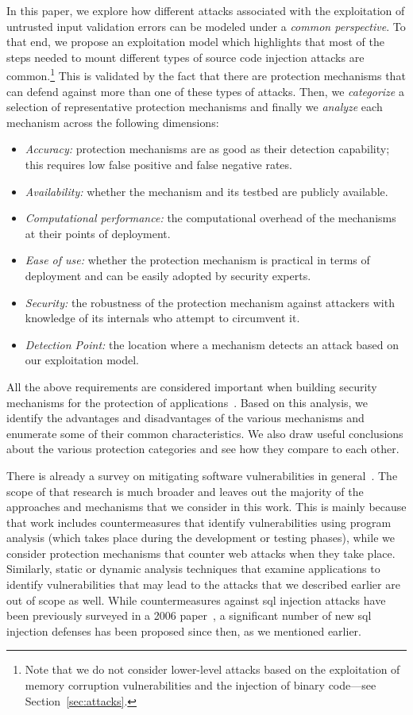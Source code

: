 \documentclass[conference]{IEEEtran}
\begin{document}
In this paper, we explore how different attacks associated with 
the exploitation of untrusted input validation errors can be modeled 
under a {\it common perspective}. To that end, we propose an exploitation
model which highlights that most of the steps needed to mount
different types of source code injection attacks are
common.\footnote{Note that we do not consider lower-level attacks based on
the exploitation of memory corruption vulnerabilities and the injection
of binary code---see Section~\ref{sec:attacks}.} This is validated by the fact that
there are protection mechanisms that can defend against more than one of these
types of attacks. Then, we {\it categorize} a selection of representative
protection mechanisms and finally we {\it analyze} each mechanism across the
following dimensions:
\begin{itemize}
\item {\it Accuracy:} protection mechanisms are as good
  as their detection capability; this requires low false positive and
  false negative rates.
\item {\it Availability:} whether the mechanism and its
  testbed are publicly available.
\item {\it Computational performance:} the computational
  overhead of the mechanisms at their points of deployment.
\item {\it Ease of use:} whether the protection
  mechanism is practical in terms of deployment
  and can be easily adopted by security experts.
\item {\it Security:} the robustness of the protection mechanism against
  attackers with knowledge of its internals who attempt to circumvent it.
\item {\it Detection Point:} the location where a mechanism detects an attack
  based on our exploitation model.
\end{itemize}

\noindent
All the above requirements are considered important
when building security mechanisms for the protection of
applications~\cite{A01,A00,SPWS13,nature2014}.
Based on this analysis, we identify the advantages
and disadvantages of the
various mechanisms and enumerate some of their common
characteristics. We also draw useful conclusions
about the various protection categories and see how they compare
to each other.

There is already a survey on mitigating software vulnerabilities
in general~\cite{SZ12}. The scope of that
research is much broader and leaves out the majority of the
approaches and mechanisms that we consider in this work.
This is mainly because that work includes countermeasures
that identify vulnerabilities using program analysis
(which takes place during the development or testing phases), while
we consider protection mechanisms that counter
web attacks when they take place. Similarly, static or
dynamic analysis techniques that examine applications to
identify vulnerabilities that may lead to the attacks
that we described earlier are out of scope as well.
While countermeasures against {\sc sql}
injection attacks have been previously surveyed in a 2006 paper~\cite{HVO06},
a significant number of new {\sc sql} injection defenses has been proposed since
then, as we mentioned earlier.
\end{document}
